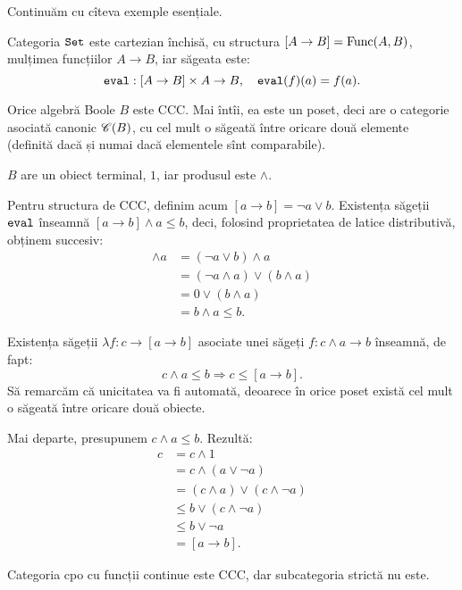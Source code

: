 Continuăm cu cîteva exemple esențiale.

Categoria $ \texttt{Set} $ este cartezian închisă, cu structura $ [A \to B] = \mathrm{Func}(A, B) $,
mulțimea funcțiilor $ A \to B $, iar săgeata  este:
\[
  \texttt{eval} : [A \to B] \times A \to B, \quad \texttt{eval}(f)(a) = f(a).
\]

\vspace{1cm}

Orice algebră Boole $ B $ este CCC. Mai întîi, ea este un poset, deci are o categorie
asociată canonic $ \mathscr{C}(B) $, cu cel mult o săgeată între oricare două elemente
(definită dacă și numai dacă elementele sînt comparabile).

$ B $ are un obiect terminal, $ 1 $, iar produsul este $ \land $.

Pentru structura de CCC, definim acum $ [a \to b] = \lnot a \lor b $. Existența
săgeții $ \texttt{eval} $ înseamnă $ [a \to b] \land a \leq b $, deci, folosind
proprietatea de latice distributivă, obținem succesiv:
\begin{align*}
  [ a \to b] \land a &= (\lnot a \lor b) \land a \\
                     &= (\lnot a \land a) \lor (b \land a) \\
                     &= 0 \lor (b \land a) \\
                     &= b \land a \leq b.
\end{align*}

Existența săgeții $ \lambda f : c \to [a \to b] $ asociate unei săgeți $ f : c \land a \to b $
înseamnă, de fapt:
\[
  c \land a \leq b \Rightarrow c \leq [a \to b].
\]
Să remarcăm că unicitatea va fi automată, deoarece în orice poset există cel mult o
săgeată între oricare două obiecte.

Mai departe, presupunem $ c \land a \leq b $. Rezultă:
\begin{align*}
  c &= c \land 1 \\
    &= c \land (a \lor \lnot a) \\
    &= (c \land a) \lor (c \land \lnot a) \\
    &\leq b \lor (c \land \lnot a) \\
    &\leq  b \lor \lnot a \\
    &= [a \to b].
\end{align*}

\vspace{1cm}

Categoria cpo cu funcții continue este CCC, dar subcategoria strictă nu este.


